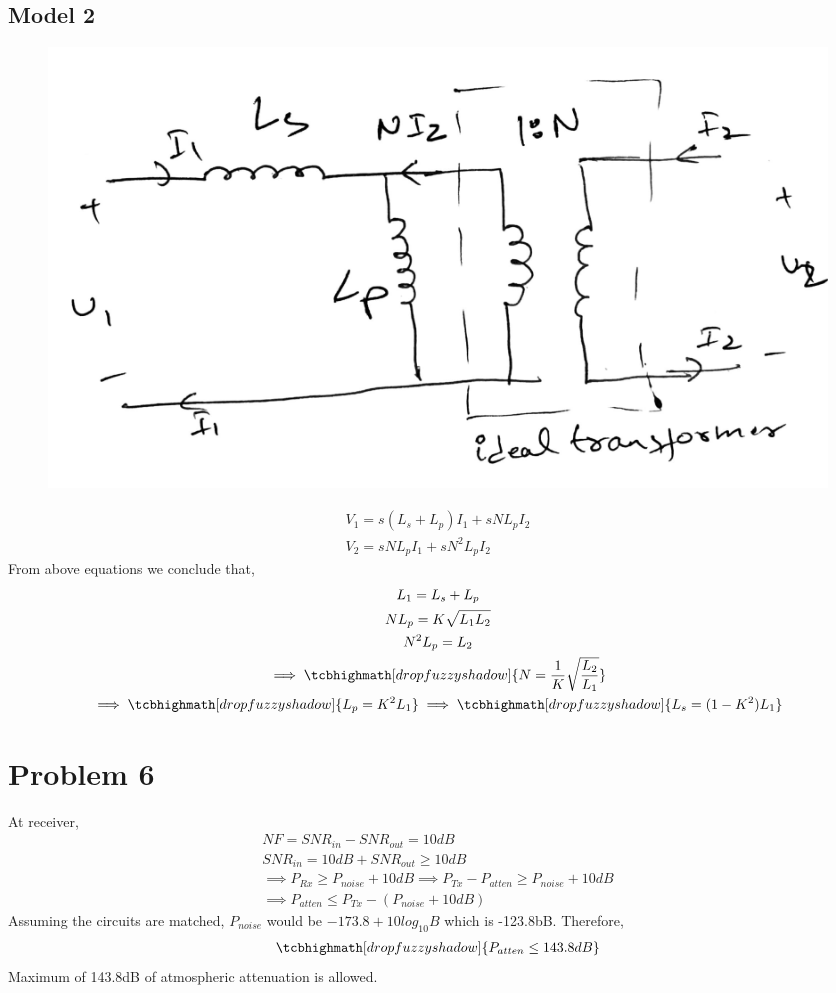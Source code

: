 \documentclass{article}
\begin{document}
\subsection*{Model 2}
\begin{figure}[H]
	\centering
	\includegraphics[scale=0.3]{./figs/5m2.png}
\end{figure}
\begin{gather*}
V_1 = s(L_s + L_p)I_1 + sNL_pI_2\\
V_2 = sNL_pI_1 + sN^2L_pI_2
\end{gather*}
From above equations we conclude that,
\begin{gather*}
L_1 = L_s + L_p\\
NL_p = K\sqrt{L_1L_2}\\
N^2L_p = L_2\\
\implies \tcbhighmath[drop fuzzy shadow]{N =  \frac{1}{K}\sqrt{\frac{L_2}{L_1}}}\\
\implies \tcbhighmath[drop fuzzy shadow]{L_p = K^2L_1}
\implies \tcbhighmath[drop fuzzy shadow]{L_s = (1 - K^2)L_1}
\end{gather*}
\section*{\hfil Problem 6}
At receiver,
\begin{gather*}
NF = SNR_{in} - SNR_{out} = 10dB\\
SNR_{in} = 10dB + SNR_{out} \ge 10dB\\
\implies P_{Rx} \ge P_{noise} + 10dB \implies P_{Tx} - P_{atten} \ge P_{noise} + 10dB\\
\implies P_{atten} \le  P_{Tx} - (P_{noise} + 10dB)
\end{gather*}
Assuming the circuits are matched, $P_{noise}$ would be $-173.8 + 10log_{10}B$ which is -123.8bB. Therefore,
\begin{gather*}
\tcbhighmath[drop fuzzy shadow]{P_{atten} \le 143.8dB}
\end{gather*}
Maximum of 143.8dB of atmospheric attenuation is allowed.
\end{document}
